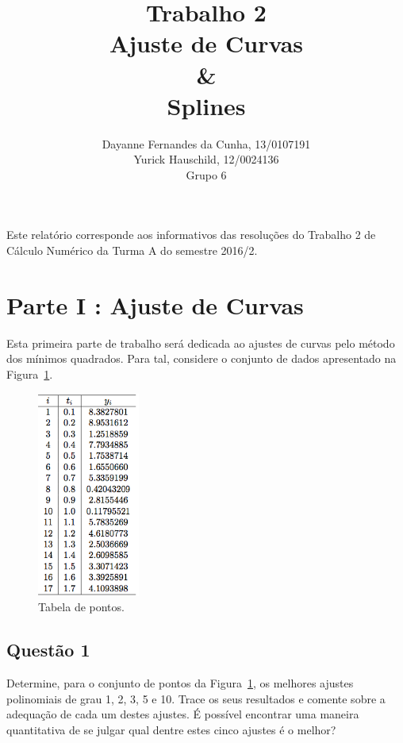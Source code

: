 \documentclass[12pt]{article}
\title{Trabalho 2\\
Ajuste de Curvas\\
\& \\
Splines}
\author{Dayanne Fernandes da Cunha, 13/0107191\\
       Yurick Hauschild, 12/0024136\\
       Grupo 6
}
\begin{document}
\maketitle


 \begin{resumo}
 	Este relatório corresponde aos informativos das resoluções do Trabalho 2 de Cálculo Numérico da Turma A do semestre 2016/2.
 \end{resumo}

\section{Parte I : Ajuste de Curvas}
\label{sec:parte1}

Esta primeira parte de trabalho será dedicada ao ajustes de curvas pelo método dos mínimos quadrados. Para tal, considere o conjunto de dados apresentado na Figura~\ref{fig:tab1}.

\begin{figure}[H]
	\centering
	\includegraphics[width=0.3\textwidth]{tab1.png}
	\caption{Tabela de pontos.}
	\label{fig:tab1}
\end{figure}

\subsection{Questão 1}
\label{subsec:p1q1}

Determine, para o conjunto de pontos da Figura~\ref{fig:tab1}, os melhores ajustes polinomiais de grau 1, 2, 3, 5 e 10. Trace os seus resultados e comente sobre a adequação de cada um destes ajustes. É possível encontrar uma maneira quantitativa de se julgar qual dentre estes cinco ajustes é o melhor?
\end{document}
